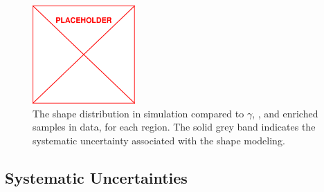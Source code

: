 \begin{figure}
	\includegraphics[width=0.35\textwidth]{figs/placeholder}
	\caption{The \mttwo shape distribution in \znunu simulation compared to $\gamma$, \wlnu, and \zll enriched samples in data, for each \HT region. The solid grey band indicates the systematic uncertainty associated with the \mttwo shape modeling.}
	\label{fig:zinvMt2Shape}
\end{figure}

\subsection{Systematic Uncertainties}
\label{subsec:zinvSyst}

